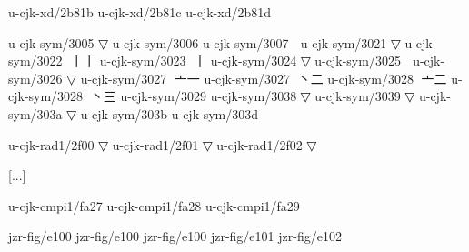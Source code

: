 \begin{multicols}{2}
[...]

u-cjk-xd/2b81b	{	}
u-cjk-xd/2b81c	{	}
u-cjk-xd/2b81d	{	}

u-cjk-sym/3005	{	}▽
u-cjk-sym/3006	{	}
u-cjk-sym/3007	{\cjk{}}	{\cnxJzr{}\cjkgGlue}
u-cjk-sym/3021	{	}▽
u-cjk-sym/3022	{\cjk{}}	{\cnxJzr{}\cjkgGlue}{\cjk{}丨丨}
u-cjk-sym/3023	{\cjk{}}	{\cnxJzr{}\cjkgGlue}{丨}
u-cjk-sym/3024	{	}▽
u-cjk-sym/3025	{\cjk{}}	{\cnxJzr{}\cjkgGlue}
u-cjk-sym/3026	{	}▽
u-cjk-sym/3027	{\cjk{}}	{\cnxJzr{}\cjkgGlue}{\cjk{}亠一}
u-cjk-sym/3027	{\cjk{}}	{\cnxJzr{}\cjkgGlue}{\cjk{}丶二}
u-cjk-sym/3028	{\cjk{}}	{\cnxJzr{}\cjkgGlue}{\cjk{}亠二}
u-cjk-sym/3028	{\cjk{}}	{\cnxJzr{}\cjkgGlue}{\cjk{}丶三}
u-cjk-sym/3029	{	}
u-cjk-sym/3038	{	}▽
u-cjk-sym/3039	{	}▽
u-cjk-sym/303a	{	}▽
u-cjk-sym/303b	{	}
u-cjk-sym/303d	{\cjk{}}	{\cnxJzr{}\cjkgGlue}

u-cjk-rad1/2f00	{	}▽
u-cjk-rad1/2f01	{	}▽
u-cjk-rad1/2f02	{	}▽

[...]

u-cjk-cmpi1/fa27	{	}
u-cjk-cmpi1/fa28	{	}
u-cjk-cmpi1/fa29	{	}

jzr-fig/e100	{	}jzr-fig/e100	{	}
jzr-fig/e100	{	}
jzr-fig/e101	{	}jzr-fig/e102	{	}


\end{multicols}
